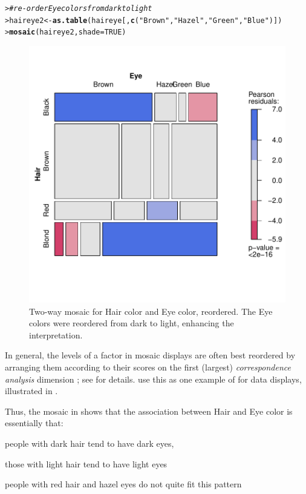 \documentclass[10pt,krantz2]{krantz}\usepackage[]{graphicx}\usepackage[]{color}
\makeatletter
\newcommand{\hlnum}[1]{\textcolor[rgb]{0.686,0.059,0.569}{#1}}%
\newcommand{\hlstr}[1]{\textcolor[rgb]{0.192,0.494,0.8}{#1}}%
\newcommand{\hlcom}[1]{\textcolor[rgb]{0.678,0.584,0.686}{\textit{#1}}}%
\newcommand{\hlstd}[1]{\textcolor[rgb]{0.345,0.345,0.345}{#1}}%
\newcommand{\hlkwb}[1]{\textcolor[rgb]{0.69,0.353,0.396}{#1}}%
\newcommand{\hlkwc}[1]{\textcolor[rgb]{0.333,0.667,0.333}{#1}}%
\newcommand{\hlkwd}[1]{\textcolor[rgb]{0.737,0.353,0.396}{\textbf{#1}}}%
\newenvironment{kframe}{%
 \def\at@end@of@kframe{}%
 \ifinner\ifhmode%
  \def\at@end@of@kframe{\end{minipage}}%
  \begin{minipage}{\columnwidth}%
 \fi\fi%
 \def\FrameCommand##1{\hskip\@totalleftmargin \hskip-\fboxsep
 \colorbox{shadecolor}{##1}\hskip-\fboxsep
     \hskip-\linewidth \hskip-\@totalleftmargin \hskip\columnwidth}%
 \MakeFramed {\advance\hsize-\width
   \@totalleftmargin\z@ \linewidth\hsize
   \@setminipage}}%
 {\par\unskip\endMakeFramed%
 \at@end@of@kframe}
\newenvironment{knitrout}{}{} %
\renewenvironment{knitrout}{\small\renewcommand{\baselinestretch}{.85}}{} %
\makeatother
\begin{document}
\begin{knitrout}
\color{fgcolor}\begin{kframe}
\begin{alltt}
\hlstd{> }\hlcom{# re-order Eye colors from dark to light}
\hlstd{> }\hlstd{haireye2} \hlkwb{<-} \hlkwd{as.table}\hlstd{(haireye[,} \hlkwd{c}\hlstd{(}\hlstr{"Brown"}\hlstd{,} \hlstr{"Hazel"}\hlstd{,} \hlstr{"Green"}\hlstd{,} \hlstr{"Blue"}\hlstd{)])}
\hlstd{> }\hlkwd{mosaic}\hlstd{(haireye2,} \hlkwc{shade} \hlstd{=} \hlnum{TRUE}\hlstd{)}
\end{alltt}
\end{kframe}\begin{figure}[!htbp]

\centerline{\includegraphics[width=.6\textwidth]{ch05/fig/haireye-mos9-1} }

\caption[Two-way mosaic for Hair color and Eye color, reordered]{Two-way mosaic for Hair color and Eye color, reordered. The Eye colors were reordered from dark to light, enhancing the interpretation.}\label{fig:haireye-mos9}
\end{figure}


\end{knitrout}

In general, the levels of a factor in mosaic displays
are often best reordered by
arranging them according to their scores on the first (largest)
\emph{correspondence analysis} dimension \citep{Friendly:94a};
see  for details.
\citet{FriendlyKwan:02:effect} use this as one example of
 for data displays, illustrated in .

Thus, the mosaic in  shows that the association between Hair and Eye color
is essentially that:
\begin{itemize*}
\item people with dark hair tend to have dark eyes,
\item those with light hair tend to have light eyes
\item people with red hair and hazel eyes do not quite fit this pattern
\end{itemize*}
\end{document}
